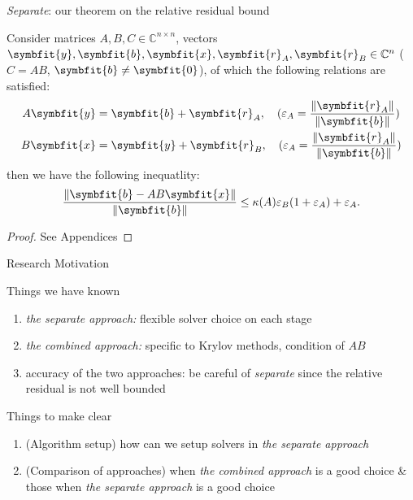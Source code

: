 \documentclass[aspectratio=169]{beamer}
\renewcommand{\bm}{\symbfit}
\begin{document}
\begin{frame}{\textit{Separate}: our theorem on the relative residual bound}
	\begin{thm}\label{relthm}
		\vspace{0pt}
		Consider matrices $A , B , C \in \mathbb{C}^{n \times n}$, vectors $\bm{y}, \bm{b}, \bm{x}, \bm{r}_{A}, \bm{r}_{B} \in \mathbb{C}^{n}$ ($C = AB$, $\bm{b} \neq \bm{0}$), of which the following relations are satisfied:
		\begin{align*}
			A\bm{y} & = \bm{b} + \bm{r}_{A}, \quad (\varepsilon_{A} = \frac{\|\bm{r}_{A}\|}{\|\bm{b}\|}) \\
			B \bm{x} & = \bm{y} + \bm{r}_{B}, \quad (\varepsilon_{A} = \frac{\|\bm{r}_{A}\|}{\|\bm{b}\|})
		\end{align*}
	then we have the following inequatlity:
	\begin{equation}
	\frac{\|\bm{b} - AB \bm{x}\|}{\|\bm{b}\|} \leq \kappa(A) \varepsilon_{B} ( 1 + \varepsilon_{A} ) + \varepsilon_{A}	
	.
	\end{equation}
	\vspace{-2em}
	\begin{proof}
		See Appendices	
	\end{proof}	
	\end{thm}
\end{frame}
\begin{frame}{Research Motivation}
	\begin{block}{Things we have known}
		\vspace{1pt}	
		\begin{enumerate}
			\item \textit{the separate approach:} flexible solver choice on each stage
			\item \textit{the combined approach:} specific to Krylov methods, condition of $AB$
			\item accuracy of the two approaches: be careful of \textit{separate} since the relative residual is not well bounded
		\end{enumerate}
	\end{block}
	\begin{block}{Things to make clear}
		\vspace{1pt}	
	\begin{enumerate}
		\item[Q1:] (Algorithm setup) how can we setup solvers in \textit{the separate approach}
		\item[Q2:] (Comparison of approaches) when \textit{the combined approach} is a good choice \& those when \textit{the separate approach} is a good choice
	\end{enumerate}
	\end{block}
\end{frame}
\end{document}
